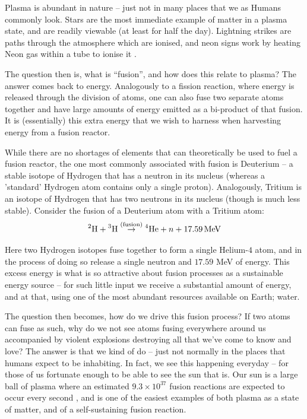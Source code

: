 Plasma is abundant in nature -- just not in many places that we as Humans commonly look. Stars are the most immediate example of matter in a plasma state, 
and are readily viewable (at least for half the day). Lightning strikes are paths through the atmosphere which are ionised, 
and neon signs work by heating Neon gas within a tube to ionise it .

The question then is, what is ``fusion'', and how does this relate to plasma? The answer comes back to energy. Analogously to a fission reaction, 
where energy is released through the division of atoms, one can also fuse two separate atoms together and have large amounts of energy emitted 
as a bi-product of that fusion. It is (essentially) this extra energy that we wish to harness when harvesting energy from a fusion reactor.

While there are no shortages of elements that can theoretically be used to fuel a fusion reactor, the one most commonly associated with fusion is Deuterium -- a stable isotope of Hydrogen that 
has a neutron in its nucleus (whereas a 'standard' Hydrogen atom contains only a single proton). Analogously, Tritium is an isotope of Hydrogen
that has two neutrons in its nucleus (though is much less stable). Consider the fusion of a Deuterium atom with a Tritium atom:
\[ \prescript{2}{}{\text{H}} + \prescript{3}{}{\text{H}} \stackrel{\text{(fusion)}}{\to} \prescript{4}{}{\text{He}} + n + 17.59 \, \text{MeV} \]

Here two Hydrogen isotopes fuse together to form a single Helium-$4$ atom, and in the process of doing so release 
a single neutron and $17.59$ MeV of energy. This excess energy is what is so attractive about fusion processes as a sustainable 
energy source -- for such little input we receive a substantial amount of energy, and at that, using one of the most abundant 
resources available on Earth; water.

The question then becomes, how do we drive this fusion process? If two atoms can fuse as such, why do we not 
see atoms fusing everywhere around us accompanied by violent explosions destroying all that we've 
come to know and love? The answer is that we kind of do -- just not normally in the places that humans expect to be inhabiting. In fact, we see this happening everyday --
for those of us fortunate enough to be able to see the sun that is. Our sun 
is a large ball of plasma where an estimated $9.3 \times 10^{37}$ fusion reactions are expected to occur every second \cite{nasa-sun-fusion}, 
and is one of the easiest examples of both plasma as a state of matter, and of a self-sustaining fusion reaction.

